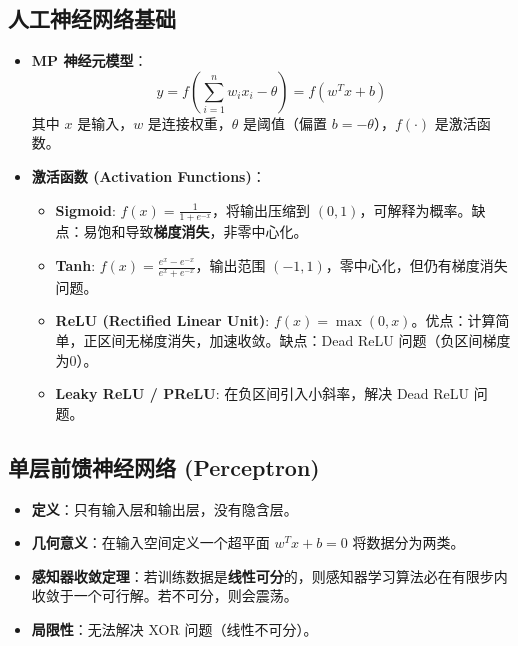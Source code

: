\documentclass[a4paper, 11pt]{ctexart}
\begin{document}
\subsection{人工神经网络基础}
\begin{itemize}
    \item \textbf{MP 神经元模型}：
    $$ y = f\left( \sum_{i=1}^n w_i x_i - \theta \right) = f(w^T x + b) $$
    其中 $x$ 是输入，$w$ 是连接权重，$\theta$ 是阈值（偏置 $b=-\theta$），$f(\cdot)$ 是激活函数。
    \item \textbf{激活函数 (Activation Functions)}：
    \begin{itemize}
        \item \textbf{Sigmoid}: $f(x) = \frac{1}{1+e^{-x}}$，将输出压缩到 $(0,1)$，可解释为概率。缺点：易饱和导致\textbf{梯度消失}，非零中心化。
        \item \textbf{Tanh}: $f(x) = \frac{e^x - e^{-x}}{e^x + e^{-x}}$，输出范围 $(-1, 1)$，零中心化，但仍有梯度消失问题。
        \item \textbf{ReLU (Rectified Linear Unit)}: $f(x) = \max(0, x)$。优点：计算简单，正区间无梯度消失，加速收敛。缺点：Dead ReLU 问题（负区间梯度为0）。
        \item \textbf{Leaky ReLU / PReLU}: 在负区间引入小斜率，解决 Dead ReLU 问题。
    \end{itemize}
\end{itemize}

\subsection{单层前馈神经网络 (Perceptron)}
\begin{itemize}
    \item \textbf{定义}：只有输入层和输出层，没有隐含层。
    \item \textbf{几何意义}：在输入空间定义一个超平面 $w^T x + b = 0$ 将数据分为两类。
    \item \textbf{感知器收敛定理}：若训练数据是\textbf{线性可分}的，则感知器学习算法必在有限步内收敛于一个可行解。若不可分，则会震荡。
    \item \textbf{局限性}：无法解决 XOR 问题（线性不可分）。
\end{itemize}
\end{document}
